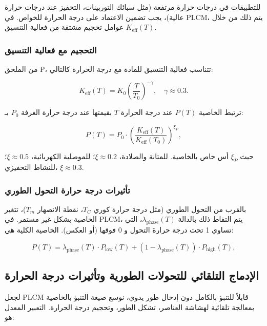 \documentclass[11pt,a4paper]{article}
\newcommand{\Keff}{K_{\mathrm{eff}}}
\begin{document}
\begin{otherlanguage}{arabic}
		للتطبيقات في درجات حرارة مرتفعة (مثل سبائك التوربينات، التحفيز عند درجات حرارة عالية)، يجب تضمين الاعتماد على درجة الحرارة للخواص. في PLCM، يتم ذلك من خلال عوامل تحجيم مشتقة من فعالية التنسيق \(\Keff(T)\).
		
		\subsubsection{التحجيم مع فعالية التنسيق}
		من الملحق P، تتناسب فعالية التنسيق للمادة مع درجة الحرارة كالتالي:
		
		\begin{equation}
			\Keff(T) = K_0 \left( \frac{T}{T_0} \right)^{-\gamma}, \quad \gamma \approx 0.3.
			\label{eq:keff-T}
		\end{equation}
		
		ترتبط الخاصية \(P(T)\) عند درجة الحرارة \(T\) بقيمتها عند درجة حرارة الغرفة \(P_0\) بـ:
		
		\begin{equation}
			P(T) = P_0 \cdot \left( \frac{\Keff(T)}{\Keff(T_0)} \right)^{\xi_P},
			\label{eq:property-T-scaling}
		\end{equation}
		
		حيث \(\xi_P\) أس خاص بالخاصية. للمتانة والصلادة، \(\xi \approx 0.2\)؛ للموصلية الكهربائية، \(\xi \approx 0.5\)؛ للنشاط التحفيزي، \(\xi \approx 0.3\).
		
		\subsubsection{تأثيرات درجة حرارة التحول الطوري}
		بالقرب من التحول الطوري (مثل درجة حرارة كوري \(T_C\)، نقطة الانصهار \(T_m\))، تتغير الخاصية بشكل غير مستمر. في PLCM، يتم التقاط ذلك بالدالة \(\lambda_{\text{phase}}(T)\)، التي تساوي 1 تحت درجة حرارة التحول و 0 فوقها (أو العكس). الخاصية الكلية هي:
		
		\begin{equation}
			P(T) = \lambda_{\text{phase}}(T) \cdot P_{\text{low}}(T) + (1-\lambda_{\text{phase}}(T)) \cdot P_{\text{high}}(T),
			\label{eq:phase-transition}
		\end{equation}
		
		\subsection{الإدماج التلقائي للتحولات الطورية وتأثيرات درجة الحرارة}
		\label{subsec:auto-phase}
		
		لجعل PLCM قابلاً للتنبؤ بالكامل دون إدخال طور يدوي، نوسع صيغة التنبؤ بالخاصية بمعالجة تلقائية لهشاشة العناصر، تشكل الطور، وتحجيم درجة الحرارة. التعبير المعدل هو:
		

\end{otherlanguage}
\end{document}
